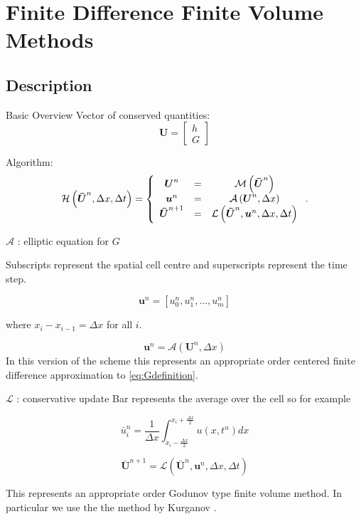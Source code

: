 \documentclass[pdf]{beamer}
\begin{document}
\section{Finite Difference Finite Volume Methods}
\subsection{Description}

\begin{frame}{Basic Overview}
Vector of conserved quantities:
\[\boldsymbol{U} = 
\left[
\begin{array}{c}
h \\
G							
\end{array} \right] \]

Algorithm:
\[\mathcal{H}\left(\boldsymbol{\bar{U}}^n,\Delta x ,\Delta t \right) = \left\lbrace 
\begin{array}{c c c} 
	\boldsymbol{U}^n &=& \mathcal{M}\left(\boldsymbol{\bar{U}}^n\right) \\
	\boldsymbol{u}^n &=& \mathcal{A}\left(\boldsymbol{U}^n, \Delta x\right) \\
	\boldsymbol{\bar{U}}^{n+1} &=& \mathcal{L}\left(\boldsymbol{\bar{U}}^{n},\boldsymbol{u}^n, \Delta x ,\Delta t\right)							
\end{array} \right. .\]
\end{frame}

\begin{frame}{$\mathcal{A}$ : elliptic equation for $G$}

Subscripts represent the spatial cell centre and superscripts represent the time step.

\[\boldsymbol{u}^n = \left[u_0^n ,u_1^n , \dots , u_m^n\right]\]

where $x_i - x_{i-1} = \Delta x$ for all $i$. 

\[	\boldsymbol{u}^n = \mathcal{A}\left(\boldsymbol{U}^n, \Delta x\right) \]
In this version of the scheme this represents an appropriate order centered finite difference approximation to \eqref{eq:Gdefinition}.
\end{frame}

\begin{frame}{$\mathcal{L}$ : conservative update}
Bar represents the average over the cell so for example

\[\bar{u}^n_i = \frac{1}{\Delta x}\int_{x_i - \frac{\Delta x}{2}}^{x_i + \frac{\Delta x}{2}} u(x,t^n) dx\]



\[\boldsymbol{\bar{U}}^{n+1} = \mathcal{L}\left(\boldsymbol{\bar{U}}^{n},\boldsymbol{u}^n, \Delta x ,\Delta t\right)\]

This represents an appropriate order Godunov type finite volume method. In particular we use the the method by Kurganov \cite{Kurganov-etal-2001-707}.

\end{frame}
\end{document}

